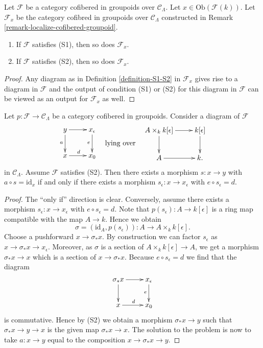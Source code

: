 \begin{lemma}
\label{lemma-S1-S2-localize}
Let $\mathcal{F}$ be a category cofibered in groupoids over
$\mathcal{C}_\Lambda$. Let $x \in \text{Ob}(\mathcal{F}(k))$.
Let $\mathcal{F}_x$ be the category cofibred in groupoids over
$\mathcal{C}_\Lambda$ constructed in
Remark \ref{remark-localize-cofibered-groupoid}.
\begin{enumerate}
\item If $\mathcal{F}$ satisfies (S1), then so does $\mathcal{F}_x$. 
\item If $\mathcal{F}$ satisfies (S2), then so does $\mathcal{F}_x$.
\end{enumerate}
\end{lemma}

\begin{proof}
Any diagram as in
Definition \ref{definition-S1-S2}
in $\mathcal{F}_x$ gives rise to a diagram in $\mathcal{F}$
and the output of condition (S1) or (S2) for this diagram in $\mathcal{F}$
can be viewed as an output for $\mathcal{F}_x$ as well.
\end{proof}

\begin{lemma}
\label{lemma-lifting-section}
Let $p: \mathcal{F} \to \mathcal{C}_\Lambda$ be a category cofibered in 
groupoids. Consider a diagram of $\mathcal{F}$
$$
\vcenter{
\xymatrix{
y \ar[r] \ar[d]_a & x_\epsilon \ar[d]_e \\
x \ar[r]^d        & x_0
}
}
\quad\text{lying over}\quad
\vcenter{
\xymatrix{
A \times_k k[\epsilon] \ar[r] \ar[d] & k[\epsilon] \ar[d] \\
A \ar[r] & k.
}
}
$$
in $\mathcal{C}_\Lambda$. Assume $\mathcal{F}$ satisfies (S2).
Then there exists a morphism $s : x \to y$ with $a \circ s = \text{id}_x$
if and only if there exists a morphism $s_\epsilon : x \to x_\epsilon$
with $e \circ s_\epsilon = d$.
\end{lemma}

\begin{proof}
The ``only if'' direction is clear.  Conversely, assume there exists a
morphism $s_\epsilon : x \to x_\epsilon$ with $e \circ s_\epsilon = d$.
Note that $p(s_\epsilon) : A \to k[\epsilon]$ is a ring map compatible
with the map $A \to k$. Hence we obtain
$$
\sigma = (\text{id}_A, p(s_\epsilon)) : A \to A \times_{k} k[\epsilon].
$$
Choose a pushforward $x \to \sigma_*x$. By construction we can factor
$s_\epsilon$ as $x \to \sigma_*x \to x_\epsilon$. Moreover, as $\sigma$
is a section of $A \times_k k[\epsilon] \to A$, we get a morphism
$\sigma_*x \to x$ which is a section of $x \to \sigma_*x$. Because
$e \circ s_\epsilon = d$ we find that the diagram
$$
\xymatrix{
\sigma_*x \ar[r] \ar[d] & x_\epsilon \ar[d]_e \\
x \ar[r]^d        & x_0
}
$$
is commutative. Hence by (S2) we obtain a morphism $\sigma_*x \to y$
such that $\sigma_*x \to y \to x$ is the given map $\sigma_*x \to x$.
The solution to the problem is now to take $a : x \to y$ equal to
the composition $x \to \sigma_*x \to y$.
\end{proof}

